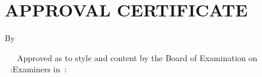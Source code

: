 
\chapter*{APPROVAL CERTIFICATE}

\parbox{\textwidth}{\centering\MakeUppercase{\thetitle}

\vspace{6pt}{\noindent\newline\theThesisType}

\vspace{6pt}By

\vspace{6pt}{\ifdefined\theStudyType\theauthor\else\authorswithroll\fi}
}

\noindent
{~~~Approved as to style and content by the %
\ifdefined\theStudyType Board of Examination on \theDefenseDay~\theDefenseDate\,:\else Examiners in \theDefenseDate\,:\fi
}


\vspace{4ex}


